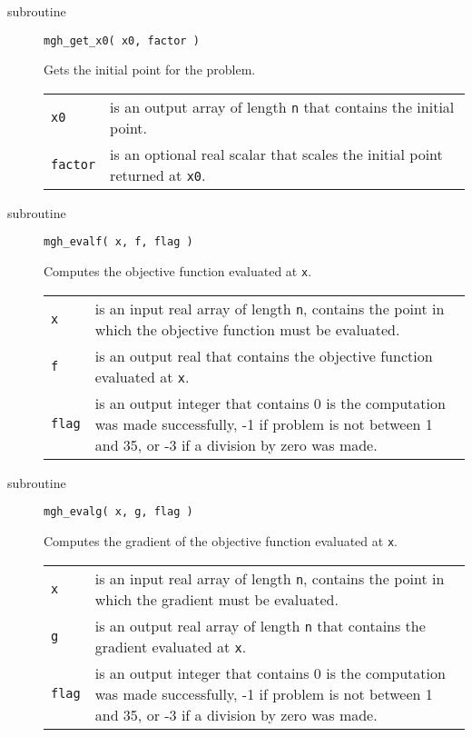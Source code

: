 \documentclass[11pt]{article}
\begin{document}
\begin{description}
\item[subroutine] \verb|mgh_get_x0( x0, factor )|

  Gets the initial point for the problem.

  \begin{longtable}{p{1cm} p{13.4cm}}
    \verb|x0| & is an output array of length \verb|n| that contains
    the initial point. \\[1ex]

    \verb|factor| & is an optional real scalar that scales the initial
    point returned at \verb|x0|.
  \end{longtable}

\item[subroutine] \verb|mgh_evalf( x, f, flag )|

  Computes the objective function evaluated at \verb|x|.

  \begin{longtable}{p{1cm} p{13.4cm}}
    \verb|x| & is an input real array of length \verb|n|, contains the
    point in which the objective function must be evaluated. \\[1ex]

    \verb|f| & is an output real that contains the objective function
    evaluated at \verb|x|. \\[1ex]

    \verb|flag| & is an output integer that contains 0 is the
    computation was made successfully, -1 if problem is not between 1
    and 35, or -3 if a division by zero was made.
  \end{longtable}

\item[subroutine] \verb|mgh_evalg( x, g, flag )|

  Computes the gradient of the objective function evaluated at
  \verb|x|.

  \begin{longtable}{p{1cm} p{13.4cm}}
    \verb|x| & is an input real array of length \verb|n|, contains the
    point in which the gradient must be evaluated. \\[1ex]

    \verb|g| & is an output real array of length \verb|n| that
    contains the gradient evaluated at \verb|x|. \\[1ex]

    \verb|flag| & is an output integer that contains 0 is the
    computation was made successfully, -1 if problem is not between 1
    and 35, or -3 if a division by zero was made.
  \end{longtable}


\end{description}
\end{document}
